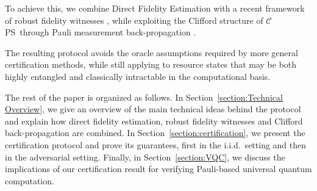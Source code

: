 \documentclass[a4paper,twocolumn,11pt,unpublished]{../../revision/quantumarticle}
\newcommand{\CEPS}{$\mathcal C$PS}
\begin{document}
To achieve this, we combine Direct Fidelity Estimation \cite{FL11direct, FOS24optimal} with a recent framework of robust fidelity witnesses \cite{CGKM21efficient}, while exploiting the Clifford structure of \CEPS~through Pauli measurement back-propagation \cite{UC24efficient}. 

The resulting protocol avoids the oracle assumptions required by more general certification methods, while still applying to resource states that may be both highly entangled and classically intractable in the computational basis.

The rest of the paper is organized as follows. In Section~\ref{section:Technical Overview}, we give an overview of the main technical ideas behind the protocol and explain how direct fidelity estimation, robust fidelity witnesses and Clifford back-propagation are combined. In Section~\ref{section:certification}, we present the certification protocol and prove its guarantees, first in the i.i.d.\ setting and then in the adversarial setting. Finally, in Section~\ref{section:VQC}, we discuss the implications of our certification result for verifying Pauli-based universal quantum computation.
\end{document}
